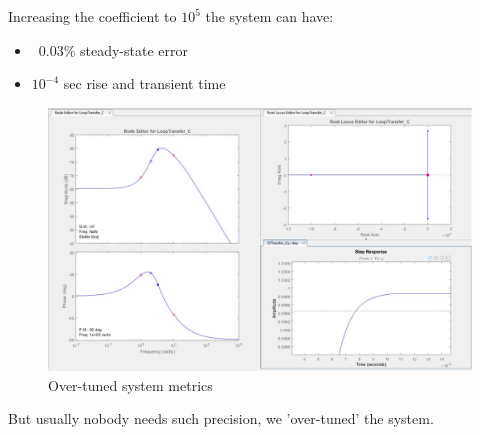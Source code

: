 \documentclass[12pt,letterpaper]{article}
\begin{document}
    Increasing the coefficient to $10^5$ the system can have:
        \begin{itemize}
        \item ~0.03\% steady-state error
        \item $10 ^ {-4}$ sec rise and transient time
    \end{itemize}
    \begin{figure}[H]
        \centering
        \includegraphics[width=16cm]{images/output/sys_overtuned.jpg}
        \caption{Over-tuned system metrics}
        \label{fig:tuned_metrics}
    \end{figure}
    But usually nobody needs such precision, we 'over-tuned' the system.
\end{document}
